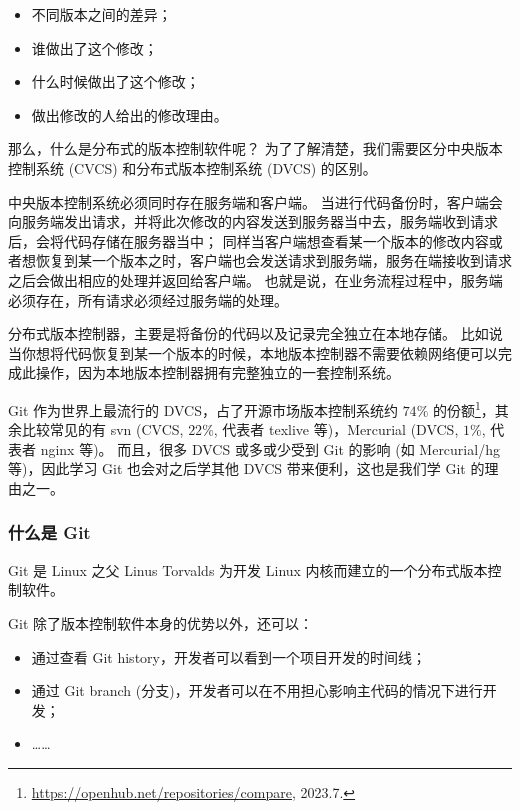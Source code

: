 \documentclass{article}
\begin{document}
	\begin{itemize}
		\itemsep0pt
		\item 不同版本之间的差异；
		\item 谁做出了这个修改；
		\item 什么时候做出了这个修改；
		\item 做出修改的人给出的修改理由。
	\end{itemize}

	那么，什么是分布式的版本控制软件呢？
	为了了解清楚，我们需要区分中央版本控制系统 (CVCS) 和分布式版本控制系统 (DVCS) 的区别。

	中央版本控制系统必须同时存在服务端和客户端。
	当进行代码备份时，客户端会向服务端发出请求，并将此次修改的内容发送到服务器当中去，服务端收到请求后，会将代码存储在服务器当中；
	同样当客户端想查看某一个版本的修改内容或者想恢复到某一个版本之时，客户端也会发送请求到服务端，服务在端接收到请求之后会做出相应的处理并返回给客户端。
	也就是说，在业务流程过程中，服务端必须存在，所有请求必须经过服务端的处理。

	分布式版本控制器，主要是将备份的代码以及记录完全独立在本地存储。
	比如说当你想将代码恢复到某一个版本的时候，本地版本控制器不需要依赖网络便可以完成此操作，因为本地版本控制器拥有完整独立的一套控制系统。\cite{net9-git}

	\noindent\hrulefill

	Git 作为世界上最流行的 DVCS，占了开源市场版本控制系统约 $74 \%$ 的份额\footnote{\url{https://openhub.net/repositories/compare}, 2023.7.}，其余比较常见的有 svn (CVCS, $22 \%$, 代表者 texlive 等)，Mercurial (DVCS, $1 \%$, 代表者 nginx 等)。
	而且，很多 DVCS 或多或少受到 Git 的影响 (如 Mercurial/hg 等)，因此学习 Git 也会对之后学其他 DVCS 带来便利，这也是我们学 Git 的理由之一。

	\subsubsection[什么是 Git]{什么是 Git\protect\cite{net9-git}}

	Git 是 Linux 之父 Linus Torvalds 为开发 Linux 内核而建立的一个分布式版本控制软件。

	Git 除了版本控制软件本身的优势以外，还可以：

	\begin{itemize}
		\itemsep0pt
		\item 通过查看 Git history，开发者可以看到一个项目开发的时间线；
		\item 通过 Git branch (分支)，开发者可以在不用担心影响主代码的情况下进行开发；
		\item ……
	\end{itemize}
\end{document}
